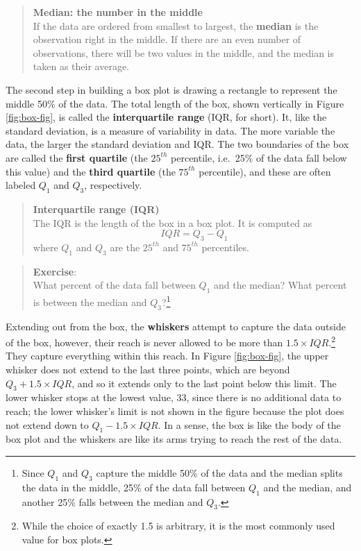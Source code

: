 \documentclass[
]{book}
\begin{document}
\begin{quote}
\textbf{Median: the number in the middle}\\
If the data are ordered from smallest to largest, the \textbf{median} is the observation right in the middle. If there are an even number of observations, there will be two values in the middle, and the median is taken as their average.
\end{quote}

The second step in building a box plot is drawing a rectangle to represent the middle 50\% of the data. The total length of the box, shown vertically in Figure \ref{fig:box-fig}, is called the \textbf{interquartile range} (IQR, for short). It, like the standard deviation, is a measure of variability in data. The more variable the data, the larger the standard deviation and IQR. The two boundaries of the box are called the \textbf{first quartile} (the \(25^{th}\) percentile, i.e.~25\% of the data fall below this value) and the \textbf{third quartile} (the \(75^{th}\) percentile), and these are often labeled \(Q_1\) and \(Q_3\), respectively.

\begin{quote}
\textbf{Interquartile range (IQR)}\\
The IQR is the length of the box in a box plot. It is computed as
\[ IQR = Q_3 - Q_1 \]
where \(Q_1\) and \(Q_3\) are the \(25^{th}\) and \(75^{th}\) percentiles.
\end{quote}

\begin{quote}
\textbf{Exercise}:\\
What percent of the data fall between \(Q_1\) and the median? What percent is between the median and \(Q_3\)?\footnote{Since \(Q_1\) and \(Q_3\) capture the middle 50\% of the data and the median splits the data in the middle, 25\% of the data fall between \(Q_1\) and the median, and another 25\% falls between the median and \(Q_3\).}
\end{quote}

Extending out from the box, the \textbf{whiskers} attempt to capture the data outside of the box, however, their reach is never allowed to be more than \(1.5\times IQR\).\footnote{While the choice of exactly 1.5 is arbitrary, it is the most commonly used value for box plots.} They capture everything within this reach. In Figure \ref{fig:box-fig}, the upper whisker does not extend to the last three points, which are beyond \(Q_3 + 1.5\times IQR\), and so it extends only to the last point below this limit. The lower whisker stops at the lowest value, 33, since there is no additional data to reach; the lower whisker's limit is not shown in the figure because the plot does not extend down to \(Q_1 - 1.5\times IQR\). In a sense, the box is like the body of the box plot and the whiskers are like its arms trying to reach the rest of the data.
\end{document}
